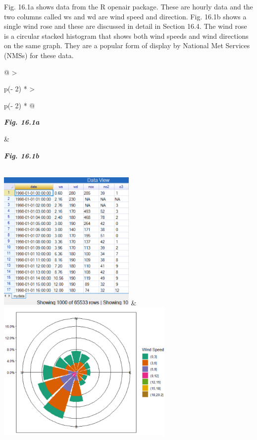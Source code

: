 \documentclass[
  letterpaper,
  DIV=11,
  numbers=noendperiod]{scrreprt}
\begin{document}
Fig. 16.1a shows data from the R openair package. These are hourly data
and the two columns called ws and wd are wind speed and direction. Fig.
16.1b shows a single wind rose and these are discussed in detail in
Section 16.4. The wind rose is a circular stacked histogram that shows
both wind speeds and wind directions on the same graph. They are a
popular form of display by National Met Services (NMSs) for these data.

\begin{longtable}[]{@{}
  >{\raggedright\arraybackslash}p{(\columnwidth - 2\tabcolsep) * }
  >{\raggedright\arraybackslash}p{(\columnwidth - 2\tabcolsep) * }@{}}
\toprule\noalign{}
\begin{minipage}[b]{\linewidth}\raggedright
\textbf{\emph{Fig. 16.1a}}
\end{minipage} & \begin{minipage}[b]{\linewidth}\raggedright
\textbf{\emph{Fig. 16.1b}}
\end{minipage} \\
\midrule\noalign{}
\endhead
\bottomrule\noalign{}
\endlastfoot
\includegraphics[width=2.62434in,height=2.68389in]{figures/Fig16.1a.png}
&
\includegraphics[width=3.38802in,height=2.69815in]{figures/Fig16.1b.png} \\
\end{longtable}
\end{document}
